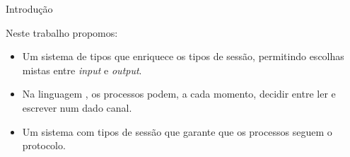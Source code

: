 \begin{frame}[fragile]{Introdução}

Neste trabalho propomos:
\begin{itemize}
\item Um sistema de tipos que enriquece os tipos de sessão, permitindo escolhas mistas entre \textit{input} e \textit{output}.
  \vspace*{2mm}
  \pause
\item Na linguagem \mixedchoice, os processos podem, a cada momento, decidir entre ler e escrever num dado canal.
  \vspace*{2mm}
  \pause
\item Um sistema com tipos de sessão que garante que os processos seguem o protocolo.
\end{itemize}

\end{frame}


